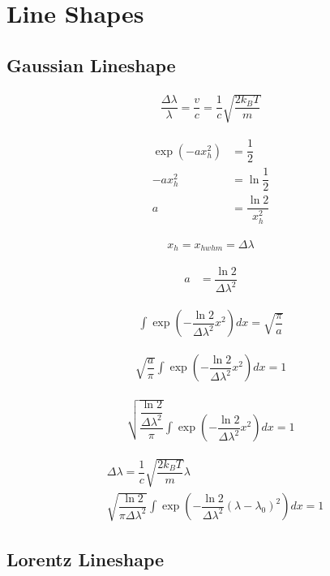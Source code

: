 \section{Line Shapes}

\subsection{Gaussian Lineshape}

\begin{align}
	\dfrac{\Delta \lambda}{\lambda} = \dfrac{v}{c} = \dfrac{1}{c} \sqrt{\dfrac{2 k_B T}{m}}
\end{align}

\begin{align}
	\exp(-a x_h^2) &= \dfrac{1}{2} \\
	-a x_h^2 &= \ln{\dfrac{1}{2}} \\
	a &= \dfrac{\ln{2}}{x_h^2}
\end{align}

\begin{align}
	x_h = x_{hwhm} = \Delta \lambda
\end{align}

\begin{align}
	a &= \dfrac{\ln{2}}{\Delta \lambda^2}
\end{align}

\begin{align}
	\int \exp\left(- \dfrac{\ln{2}}{\Delta \lambda^2} x^2\right) dx = \sqrt{\dfrac{\pi}{a}}
\end{align}

\begin{align}
	\sqrt{\dfrac{a}{\pi}} \int \exp\left(- \dfrac{\ln{2}}{\Delta \lambda^2} x^2\right) dx = 1
\end{align}

\begin{align}
	\sqrt{\dfrac{\dfrac{\ln{2}}{\Delta \lambda^2}}{\pi}} \int \exp\left(- \dfrac{\ln{2}}{\Delta \lambda^2} x^2\right) dx = 1
\end{align}

\begin{align}
	&\Delta \lambda = \dfrac{1}{c} \sqrt{\dfrac{2 k_B T}{m}} \lambda \\
	&\sqrt{\dfrac{\ln{2}}{\pi \Delta \lambda^2}} \int \exp\left(- \dfrac{\ln{2}}{\Delta \lambda^2} (\lambda - \lambda_0)^2\right) dx = 1
\end{align}

\subsection{Lorentz Lineshape}


